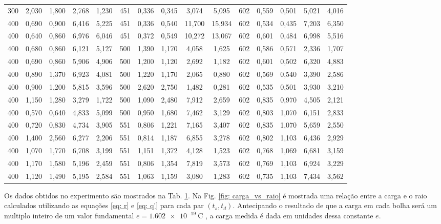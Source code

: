 \begin{table}[ht]
{\begin{tabular}{ccccc|ccccc|ccccc}
300 & 2,030 & 1,800 & 2,768 & 1,230 & 451 & 0,336 & 0,345 & 3,074 & 5,095 & 602 & 0,559 & 0,501 & 5,021 & 4,016 \\
400 & 0,690 & 0,900 & 6,416 & 5,225 & 451 & 0,336 & 0,540 & 11,700 & 15,934 & 602 & 0,534 & 0,435 & 7,203 & 6,350 \\
400 & 0,640 & 0,860 & 6,976 & 6,046 & 451 & 0,372 & 0,549 & 10,272 & 13,067 & 602 & 0,601 & 0,484 & 6,998 & 5,516 \\
400 & 0,680 & 0,860 & 6,121 & 5,127 & 500 & 1,390 & 1,170 & 4,058 & 1,625 & 602 & 0,586 & 0,571 & 2,336 & 1,707 \\
400 & 0,690 & 0,860 & 5,906 & 4,906 & 500 & 1,200 & 1,120 & 2,692 & 1,182 & 602 & 0,601 & 0,502 & 6,320 & 4,883 \\
400 & 0,890 & 1,370 & 6,923 & 4,081 & 500 & 1,220 & 1,170 & 2,065 & 0,880 & 602 & 0,569 & 0,540 & 3,390 & 2,586 \\
400 & 0,900 & 1,200 & 5,815 & 3,596 & 500 & 2,620 & 2,750 & 1,482 & 0,281 & 602 & 0,535 & 0,501 & 3,930 & 3,210 \\
400 & 1,150 & 1,280 & 3,279 & 1,722 & 500 & 1,090 & 2,480 & 7,912 & 2,659 & 602 & 0,835 & 0,970 & 4,505 & 2,121 \\
400 & 0,570 & 0,640 & 4,833 & 5,099 & 500 & 0,950 & 1,680 & 7,462 & 3,129 & 602 & 0,803 & 1,070 & 6,151 & 2,833 \\
400 & 0,720 & 0,830 & 4,734 & 3,905 & 551 & 0,806 & 1,221 & 7,165 & 3,407 & 602 & 0,835 & 1,070 & 5,659 & 2,550 \\
400 & 1,400 & 2,560 & 6,277 & 2,206 & 551 & 0,814 & 1,187 & 6,855 & 3,278 & 602 & 0,802 & 1,103 & 6,436 & 2,929 \\
400 & 1,070 & 1,770 & 6,708 & 3,199 & 551 & 1,151 & 1,372 & 4,128 & 1,523 & 602 & 0,768 & 1,069 & 6,681 & 3,159 \\
400 & 1,170 & 1,580 & 5,196 & 2,459 & 551 & 0,806 & 1,354 & 7,819 & 3,573 & 602 & 0,769 & 1,103 & 6,924 & 3,229 \\
400 & 1,120 & 1,490 & 5,195 & 2,584 & 551 & 1,063 & 1,159 & 3,080 & 1,283 & 602 & 0,735 & 1,103 & 7,434 & 3,562 \\
\midrule\bottomrule
\end{tabular}
}
\label{tab: dados}
\end{table} 
Os dados obtidos no experimento são mostrados na Tab. \ref{tab: dados}. 
Na Fig. \ref{fig: carga_vs_raio} é mostrada uma relação entre a carga e o raio calculados utilizando as equações \eqref{eq: r} e \eqref{eq: q'} para cada par $(t_s, t_d)$. 
Antecipando o resultado de que a carga em cada bolha será um multiplo inteiro de um valor fundamental $e=\qty{1,602e-19}{\coulomb}$ \citep{millikan}, a carga medida é dada em unidades dessa constante $e$.
 
